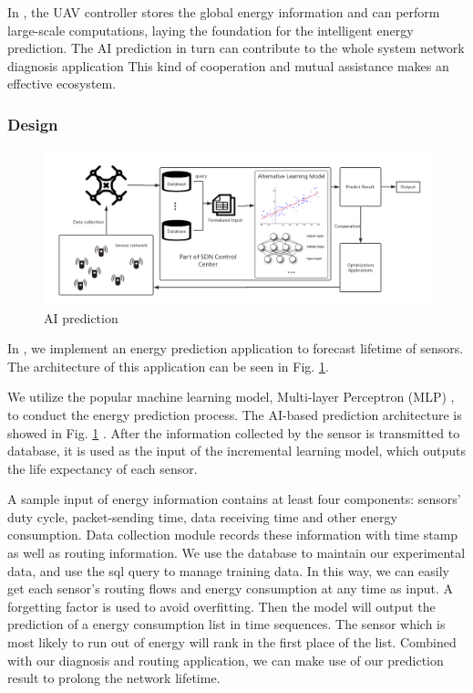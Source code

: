 In {\sdn}, the UAV controller stores the global energy information 
and can perform large-scale computations, laying 
the foundation for the intelligent energy prediction.
The AI prediction in turn can contribute to the whole system  network diagnosis application
This kind of cooperation and mutual assistance makes {\sdn} an effective ecosystem.



\subsubsection{Design}

\begin{figure}[htbp]
	\centering
	\includegraphics[width=5in]{Figure/SDWN-AIprediction}
	\caption{AI prediction}
	\label{prediction}
\end{figure}

In {\sdn},  we implement an energy prediction application 
to forecast lifetime of sensors. The architecture of this application
can be seen in Fig. \ref{prediction}.


We utilize the popular machine learning model, 
Multi-layer Perceptron (MLP) \cite{Harvey1988An},
to conduct the energy prediction process. 
The AI-based prediction architecture is  showed in Fig. \ref{prediction} .
After the information collected by the sensor is transmitted to database, it is used as
the input of the incremental learning model, which outputs the
life expectancy of each sensor. 

A sample input of energy information contains at least four components: sensors'
duty cycle, packet-sending time, data receiving time and other energy
consumption. Data collection module records these information with time stamp
as well as routing information. We use the database to maintain our experimental data,
and use the sql query to manage training data. In this way, we can easily
get each sensor's routing flows and energy consumption at any time as input. A forgetting factor
is used to avoid overfitting. Then the model will output the prediction of a energy consumption list in time
sequences. The sensor which is most likely to run out of energy will rank in the first place of the list. 
Combined with our diagnosis and routing application, we can make use of our prediction result to prolong the network
lifetime.





